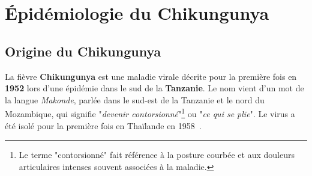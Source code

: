 \chapter{Épidémiologie du Chikungunya}

\section{Origine du Chikungunya}
La fièvre \textbf{Chikungunya} est une maladie virale décrite pour la première fois en \textbf{1952} lors d'une épidémie dans le sud de la \textbf{Tanzanie}. Le nom vient d'un mot de la langue \textit{Makonde}, parlée dans le sud-est de la Tanzanie et le nord du Mozambique, qui signifie "\textit{devenir contorsionné}"\footnote{Le terme "contorsionné" fait référence à la posture courbée et aux douleurs articulaires intenses souvent associées à la maladie.} ou "\textit{ce qui se plie}". Le virus a été isolé pour la première fois en Thaïlande en 1958~\cite{origin}.

